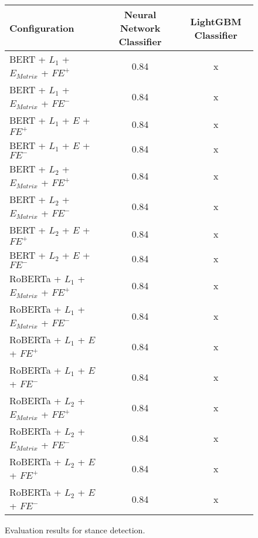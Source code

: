 \begin{figure}[H]
  \begin{center}
  	\renewcommand{\arraystretch}{1.2}
   	\begin{tabular}{|| l || c | c ||}
   	\hline
   	{\small Configuration} & {\small Neural Network Classifier} & {\small LightGBM Classifier} \\
   	\hline\hline
   	BERT + $L_1$ + $E_{Matrix}$ + $\textit{FE}^+$ & 0.84 & x \\
 	\hline
 	BERT + $L_1$ + $E_{Matrix}$ + $\textit{FE}^-$ & 0.84 & x \\
 	\hline
 	BERT + $L_1$ + $E$ + $\textit{FE}^+$ & 0.84 & x \\
 	\hline
 	BERT + $L_1$ + $E$ + $\textit{FE}^-$ & 0.84 & x \\
 	\hline
 	BERT + $L_2$ + $E_{Matrix}$ + $\textit{FE}^+$ & 0.84 & x \\
 	\hline
 	BERT + $L_2$ + $E_{Matrix}$ + $\textit{FE}^-$ & 0.84 & x \\
 	\hline
 	BERT + $L_2$ + $E$ + $\textit{FE}^+$ & 0.84 & x \\
 	\hline
 	BERT + $L_2$ + $E$ + $\textit{FE}^-$ & 0.84 & x \\
 	\hline
 	RoBERTa + $L_1$ + $E_{Matrix}$ + $\textit{FE}^+$ & 0.84 & x \\
 	\hline
 	RoBERTa + $L_1$ + $E_{Matrix}$ + $\textit{FE}^-$ & 0.84 & x \\
 	\hline
 	RoBERTa + $L_1$ + $E$ + $\textit{FE}^+$ & 0.84 & x \\
 	\hline
 	RoBERTa + $L_1$ + $E$ + $\textit{FE}^-$ & 0.84 & x \\
 	\hline
 	RoBERTa + $L_2$ + $E_{Matrix}$ + $\textit{FE}^+$ & 0.84 & x \\
 	\hline
 	RoBERTa + $L_2$ + $E_{Matrix}$ + $\textit{FE}^-$ & 0.84 & x \\
 	\hline
 	RoBERTa + $L_2$ + $E$ + $\textit{FE}^+$ & 0.84 & x \\
 	\hline
 	RoBERTa + $L_2$ + $E$ + $\textit{FE}^-$ & 0.84 & x \\
 	\hline
	\end{tabular}
	\renewcommand{\arraystretch}{1}
  \end{center}
  \caption{Evaluation results for stance detection.}%
  \label{fig:stanceresults}
\end{figure}
